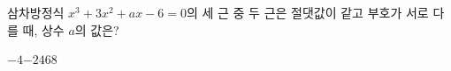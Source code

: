 삼차방정식 $x^3+3x^2+ax-6=0$의 세 근 중 두 근은 절댓값이 같고 부호가 서로 다를 때, 상수 $a$의 값은?
\begin{choices32}{$-4$}{$-2$}{$4$}{$6$}{$8$}\end{choices32}
